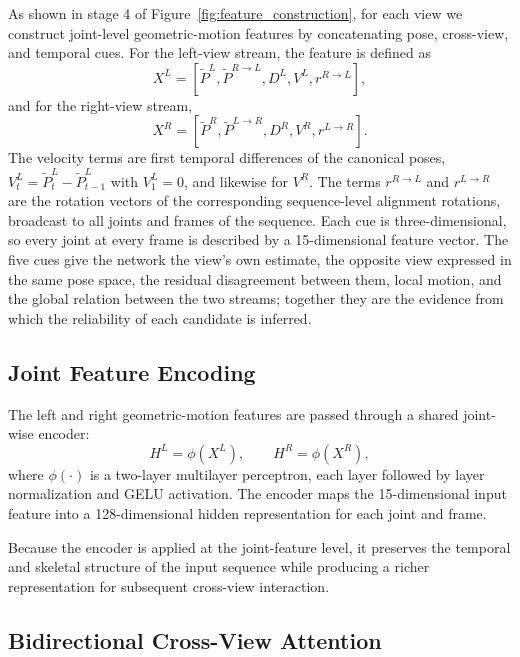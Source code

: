 \documentclass[preprint,12pt]{elsarticle}
\begin{document}
As shown in stage 4 of Figure~\ref{fig:feature_construction}, for each view we construct joint-level geometric-motion features by concatenating pose, cross-view, and temporal cues. For the left-view stream, the feature is defined as
\[
X^{L}
=
\left[
\tilde{P}^{L},
\tilde{P}^{R \rightarrow L},
D^{L},
V^{L},
r^{R \rightarrow L}
\right],
\]
and for the right-view stream,
\[
X^{R}
=
\left[
\tilde{P}^{R},
\tilde{P}^{L \rightarrow R},
D^{R},
V^{R},
r^{L \rightarrow R}
\right].
\]
The velocity terms are first temporal differences of the canonical poses, \(V^{L}_{t}=\tilde{P}^{L}_{t}-\tilde{P}^{L}_{t-1}\) with \(V^{L}_{1}=0\), and likewise for \(V^{R}\). The terms \(r^{R \rightarrow L}\) and \(r^{L \rightarrow R}\) are the rotation vectors of the corresponding sequence-level alignment rotations, broadcast to all joints and frames of the sequence. Each cue is three-dimensional, so every joint at every frame is described by a 15-dimensional feature vector. The five cues give the network the view's own estimate, the opposite view expressed in the same pose space, the residual disagreement between them, local motion, and the global relation between the two streams; together they are the evidence from which the reliability of each candidate is inferred.

\subsection{Joint Feature Encoding}
\label{subsec:joint_feature_encoding}

The left and right geometric-motion features are passed through a shared joint-wise encoder:
\[
H^{L} = \phi(X^{L}),
\qquad
H^{R} = \phi(X^{R}),
\]
where \(\phi(\cdot)\) is a two-layer multilayer perceptron, each layer followed by layer normalization and GELU activation. The encoder maps the 15-dimensional input feature into a 128-dimensional hidden representation for each joint and frame.

Because the encoder is applied at the joint-feature level, it preserves the temporal and skeletal structure of the input sequence while producing a richer representation for subsequent cross-view interaction.

\subsection{Bidirectional Cross-View Attention}
\label{subsec:cross_view_attention}
\end{document}
